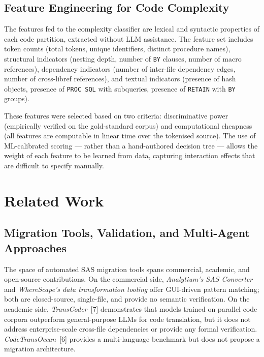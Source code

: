 \subsection{Feature Engineering for Code Complexity}
\label{subsec:code-features}

The features fed to the complexity classifier are lexical and syntactic
properties of each code partition, extracted without \ac{LLM} assistance.
The feature set includes token counts (total tokens, unique identifiers,
distinct procedure names), structural indicators (nesting depth, number of
\texttt{BY} clauses, number of macro references), dependency indicators
(number of inter-file dependency edges, number of cross-libref references),
and textual indicators (presence of hash objects, presence of
\texttt{PROC SQL} with subqueries, presence of \texttt{RETAIN} with \texttt{BY}
groups).

These features were selected based on two criteria: discriminative power
(empirically verified on the gold-standard corpus) and computational cheapness
(all features are computable in linear time over the tokenised source). The
use of ML-calibrated scoring --- rather than a hand-authored decision tree ---
allows the weight of each feature to be learned from data, capturing
interaction effects that are difficult to specify manually.

\section{Related Work}
\label{sec:related-work}

\subsection{Migration Tools, Validation, and Multi-Agent Approaches}
\label{subsec:related-migration}

The space of automated SAS migration tools spans commercial, academic, and
open-source contributions. On the commercial side, \textit{Analytium's SAS
Converter} and \textit{WhereScape's data transformation tooling} offer
GUI-driven pattern matching; both are closed-source, single-file, and provide
no semantic verification. On the academic side, \textit{TransCoder}~[7]
demonstrates that models trained on parallel code corpora outperform
general-purpose \acp{LLM} for code translation, but it does not address
enterprise-scale cross-file dependencies or provide any formal verification.
\textit{CodeTransOcean}~[6] provides a multi-language benchmark but does not
propose a migration architecture.

